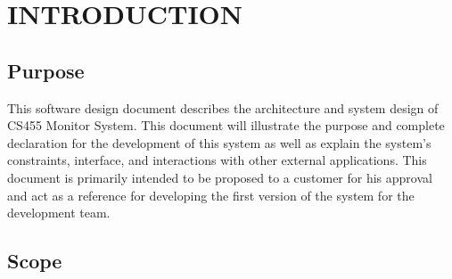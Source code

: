 \documentclass[letterpaper,12pt,oneside,listof=totoc]{scrreprt}
\begin{document}
%
%
%

\chapter{INTRODUCTION}

\section{Purpose}

This software design document describes the architecture and system design of CS455 Monitor System. This document will illustrate the purpose and complete declaration for the development of this system as well as explain the system’s  constraints, interface, and interactions with other external applications. This document is primarily intended to be proposed to a customer for his approval and act as a reference for developing the first version of the system for the development team.
\section{Scope}
\end{document}
